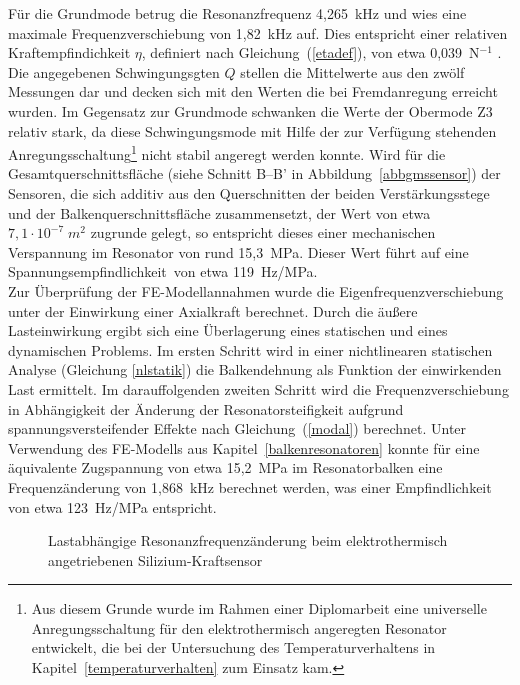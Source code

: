 Für die Grundmode betrug die Resonanzfrequenz
4,265~kHz und wies eine maximale Frequenzverschiebung von 1,82~kHz auf.
Dies entspricht einer relativen Kraftempfindichkeit $\eta$, definiert
nach Gleichung~(\ref{etadef}), von etwa 0,039~N$^{-1}$ \cite{Mue92}.
Die angegebenen Schwingungsgten $Q$ stellen die
Mittelwerte aus den zwölf Messungen dar und decken sich mit den Werten
die bei Fremdanregung erreicht wurden.
Im Gegensatz zur Grundmode schwanken die Werte der Obermode Z3 relativ
stark, da diese Schwingungsmode mit Hilfe der zur Verfügung stehenden
Anregungsschaltung\footnote{Aus diesem Grunde wurde im Rahmen
einer Diplomarbeit \cite{Wie93} eine universelle Anregungsschaltung für den
elektrothermisch angeregten Resonator entwickelt, die bei der Untersuchung
des Temperaturverhaltens in Kapitel~\ref{temperaturverhalten} zum Einsatz
kam.} nicht stabil angeregt werden konnte.
Wird für die Gesamtquerschnittsfläche (siehe Schnitt B--B' in
Abbildung~\ref{abbgmssensor})
der Sensoren, die sich additiv aus den Querschnitten der beiden
Verstärkungsstege und der Balkenquerschnittsfläche zusammensetzt, der
Wert von etwa $7,1 \cdot 10^{-7} \; m^{2}$ zugrunde gelegt,
so entspricht dieses einer mechanischen Verspannung im Resonator von
rund 15,3~MPa. Dieser Wert führt auf eine
\glqq Spannungsempfindlichkeit\grqq \, von etwa 119~Hz/MPa.\\
Zur Überprüfung der FE-Modellannahmen wurde die Eigenfrequenzverschiebung
unter der Einwirkung einer Axialkraft berechnet. Durch die äußere
Lasteinwirkung ergibt sich eine Überlagerung eines statischen und eines
dynamischen Problems. Im ersten Schritt wird in einer nichtlinearen
statischen Analyse (Gleichung \ref{nlstatik}) die Balkendehnung als Funktion
der einwirkenden Last ermittelt. Im darauffolgenden zweiten Schritt
wird die Frequenzverschiebung in Abhängigkeit der Änderung der
Resonatorsteifigkeit aufgrund spannungsversteifender Effekte nach
Gleichung~(\ref{modal}) berechnet.
Unter Verwendung des FE-Modells aus Kapitel~\ref{balkenresonatoren}
konnte für eine äquivalente Zugspannung von etwa 15,2~MPa im Resonatorbalken
eine Frequenzänderung von 1,868~kHz berechnet werden, was einer
Empfindlichkeit von etwa 123~Hz/MPa entspricht.
\begin{figure}[htb]
\begin{center}

\setabbvsi
\end{center}
\caption{\label{abbkraftfreq}
 Lastabhängige Resonanzfrequenzänderung beim
 elektrothermisch angetriebenen Silizium-Kraftsensor}
\end{figure}
